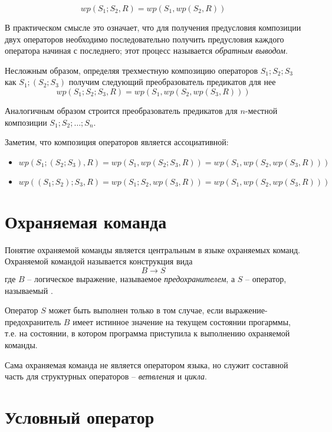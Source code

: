 \begin{equation}
	wp(S_1; S_2, R) = wp(S_1, wp(S_2, R))
\end{equation}

В практическом смысле это означает, что для получения предусловия композиции двух операторов необходимо
последовательно получить предусловия каждого оператора начиная с последнего; этот процесс называется \textit{обратным выводом}.

Несложным образом, определяя трехместную композицию операторов $S_1; S_2; S_3$ как $S_1; (S_2; S_3)$ получим
следующий преобразователь предикатов для нее
\begin{equation}
	wp(S_1; S_2; S_3, R) = wp(S_1, wp(S_2, wp(S_3, R)))
\end{equation}

Аналогичным образом строится преобразователь предикатов для $n$-местной композиции $S_1; S_2; \ldots; S_n$. 

Заметим, что композиция операторов является ассоциативной:
\begin{itemize}
	\item $wp(S_1; (S_2; S_3), R) = wp(S_1, wp(S_2; S_3, R)) = wp(S_1, wp(S_2, wp(S_3, R)))$
	\item $wp((S_1; S_2); S_3, R) = wp(S_1; S_2, wp(S_3, R)) = wp(S_1, wp(S_2, wp(S_3, R)))$
\end{itemize}
\section{Охраняемая команда}

Понятие охраняемой команды является центральным в языке охраняемых команд. 
Охраняемой командой называется конструкция вида
\begin{equation}
	B \rightarrow S
\end{equation}
где $B$ -- логическое выражение, называемое \textit{предохранителем}, а $S$ -- оператор, называемый .

Оператор $S$ может быть выполнен только в том случае, если выражение-предохранитель $B$ имеет истинное значение
на текущем состоянии прогарммы, т.е. на состоянии, в котором программа приступила к выполнению охраняемой команды.

Сама охраняемая команда не является оператором языка, но служит составной часть для структурных операторов
-- \textit{ветвления} и \textit{цикла}.

\section{Условный оператор}
\newcommand{\IF}{\textbf{if } B_1 \rightarrow S_1 \text{ | } B_2 \rightarrow S_2 \text{ | } \ldots \text{ | } B_n \rightarrow S_n \textbf{ if}}

